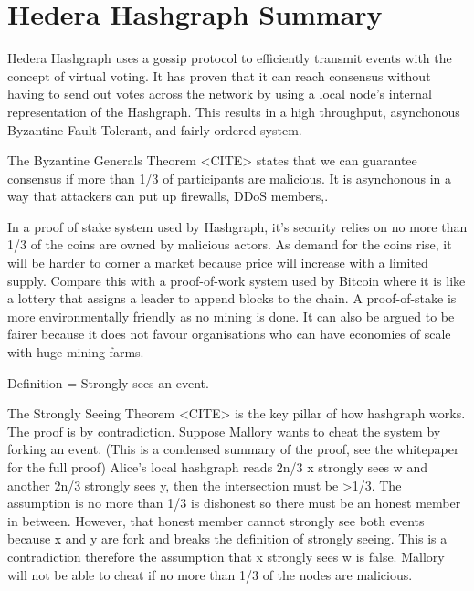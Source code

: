 \section{Hedera Hashgraph Summary}

Hedera Hashgraph uses a gossip protocol to efficiently transmit events with the concept of virtual voting. It has proven that it can reach consensus without having to send out votes across the network by using a local node's internal representation of the Hashgraph. This results in a high throughput, asynchonous Byzantine Fault Tolerant, and fairly ordered system.

The Byzantine Generals Theorem <CITE> states that we can guarantee consensus if more than 1/3 of participants are malicious. It is asynchonous in a way that attackers can put up firewalls, DDoS members,.

In a proof of stake system used by Hashgraph, it's security relies on no more than 1/3 of the coins are owned by malicious actors. As demand for the coins rise, it will be harder to corner a market because price will increase with a limited supply. Compare this with a proof-of-work system used by Bitcoin where it is like a lottery that assigns a leader to append blocks to the chain. A proof-of-stake is more environmentally friendly as no mining is done. It can also be argued to be fairer because it does not favour organisations who can have economies of scale with huge mining farms.

Definition = Strongly sees an event.


The Strongly Seeing Theorem <CITE> is the key pillar of how hashgraph works. The proof is by contradiction. Suppose Mallory wants to cheat the system by forking an event. (This is a condensed summary of the proof, see the whitepaper for the full proof) Alice's local hashgraph reads 2n/3 x strongly sees w and another 2n/3 strongly sees y, then the intersection must be >1/3. The assumption is no more than 1/3 is dishonest so there must be an honest member in between. However, that honest member cannot strongly see both events because x and y are fork and breaks the definition of strongly seeing. This is a contradiction therefore the assumption that x strongly sees w is false. Mallory will not be able to cheat if no more than 1/3 of the nodes are malicious.
